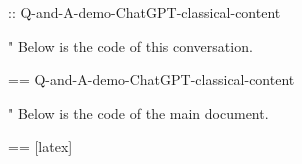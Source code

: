 \documentclass[%
  use theme = ChatGPT-classical-light,
  scroll,
]{Q-and-A}
\begin{document}
:: {Q-and-A-demo-ChatGPT-classical-content}

"
  Below is the code of this conversation.

  == {Q-and-A-demo-ChatGPT-classical-content}

"
  Below is the code of the main document.

  == [latex] {\jobname}
\end{document}
